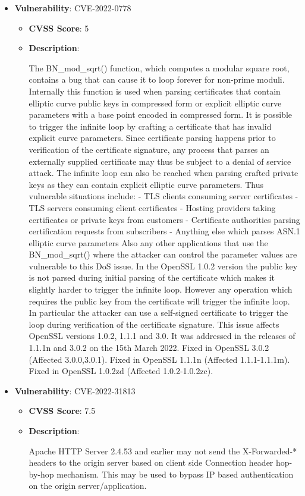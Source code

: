 \documentclass{article}
\begin{document}
\begin{itemize}
        \item \textbf{Vulnerability}: CVE-2022-0778
        \begin{itemize}
            \item \textbf{CVSS Score}:  5 
            \item \textbf{Description}:
            \parbox[t]{0.9\linewidth}{
                \ttfamily The BN\_mod\_sqrt() function, which computes a modular square root, contains a bug that can cause it to loop forever for non-prime moduli. Internally this function is used when parsing certificates that contain elliptic curve public keys in compressed form or explicit elliptic curve parameters with a base point encoded in compressed form. It is possible to trigger the infinite loop by crafting a certificate that has invalid explicit curve parameters. Since certificate parsing happens prior to verification of the certificate signature, any process that parses an externally supplied certificate may thus be subject to a denial of service attack. The infinite loop can also be reached when parsing crafted private keys as they can contain explicit elliptic curve parameters. Thus vulnerable situations include: - TLS clients consuming server certificates - TLS servers consuming client certificates - Hosting providers taking certificates or private keys from customers - Certificate authorities parsing certification requests from subscribers - Anything else which parses ASN.1 elliptic curve parameters Also any other applications that use the BN\_mod\_sqrt() where the attacker can control the parameter values are vulnerable to this DoS issue. In the OpenSSL 1.0.2 version the public key is not parsed during initial parsing of the certificate which makes it slightly harder to trigger the infinite loop. However any operation which requires the public key from the certificate will trigger the infinite loop. In particular the attacker can use a self-signed certificate to trigger the loop during verification of the certificate signature. This issue affects OpenSSL versions 1.0.2, 1.1.1 and 3.0. It was addressed in the releases of 1.1.1n and 3.0.2 on the 15th March 2022. Fixed in OpenSSL 3.0.2 (Affected 3.0.0,3.0.1). Fixed in OpenSSL 1.1.1n (Affected 1.1.1-1.1.1m). Fixed in OpenSSL 1.0.2zd (Affected 1.0.2-1.0.2zc).
            }
        \end{itemize}
    
        \item \textbf{Vulnerability}: CVE-2022-31813
        \begin{itemize}
            \item \textbf{CVSS Score}:  7.5 
            \item \textbf{Description}:
            \parbox[t]{0.9\linewidth}{
                \ttfamily Apache HTTP Server 2.4.53 and earlier may not send the X-Forwarded-* headers to the origin server based on client side Connection header hop-by-hop mechanism. This may be used to bypass IP based authentication on the origin server/application.
            }
        \end{itemize}
    

\end{itemize}
\end{document}
